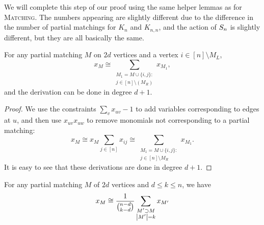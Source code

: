 We will complete this step of our proof using the same helper lemmas as for \textsc{Matching}. The numbers appearing are slightly different due to the difference in the number of partial matchings for $K_n$ and $K_{n,n}$, and the action of $S_{n}$ is slightly different, but they are all basically the same.

\begin{lemma}
  \label{lem:tsp+a}
  For any partial matching \(M\) on \(2d\) vertices
  and a vertex \(i \in [n] \setminus M_L\),
  \begin{equation}
    \label{eq:tsp+a}
    x_{M}
    \cong
    \sum_{\substack{M_{1} = M \cup \{i,j\}: \\
        j \in [n] \setminus (M_R)}}
    x_{M_{1}}
    ,
  \end{equation}
	and the derivation can be done in degree $d+1$.
\end{lemma}
\begin{proof}
We use the constraints \(\sum_{v} x_{uv} - 1\)
to add variables corresponding to edges at \(u\),
and then use \(x_{uv} x_{uw}\) to remove monomials
not corresponding to a partial matching:
\begin{equation*}
  x_{M}
  \cong
  x_{M} \sum_{j \in [n]} x_{ij}
  \cong
  \sum_{\substack{M_{1} = M \cup \{i,j\}: \\
      j \in [n] \setminus M_R}}
  x_{M_{1}}
  .
\end{equation*}
It is easy to see that these derivations are done in degree $d+1$.
\end{proof}
\begin{lemma}
  \label{lem:tsp-partial-matching}
  For any partial matching \(M\) of \(2d\) vertices
  and \(d \leq k \leq n\),
  we have
  \begin{equation}
    \label{eq:tsp-partial-matching}
    x_{M} \cong
    \frac{1}{\binom{n - d}{k - d}}
    \sum_{\substack{M' \supset M \\ \left|M'\right| = k}} x_{M'}
  \end{equation}
\end{lemma}
